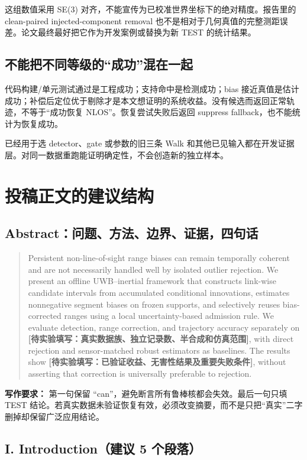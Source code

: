 \documentclass[UTF8,fontset=fandol,11pt,a4paper]{ctexart}
\newcommand{\todo}[1]{\textbf{[待实验填写：#1]}}
\newcommand{\eng}[1]{\begin{quote}\small #1\end{quote}}
\begin{document}
这组数值采用 SE(3) 对齐，不能宣传为已校准世界坐标下的绝对精度。报告里的 clean-paired injected-component removal 也不是相对于几何真值的完整测距误差。论文最终最好把它作为开发案例或替换为新 TEST 的统计结果。\cite{e2e}

\subsection{不能把不同等级的“成功”混在一起}

代码构建/单元测试通过是工程成功；支持命中是检测成功；bias 接近真值是估计成功；补偿后定位优于剔除才是本文想证明的系统收益。没有候选而返回正常轨迹，不等于“成功恢复 NLOS”。恢复尝试失败后返回 suppress fallback，也不能统计为恢复成功。

已经用于选 detector、gate 或参数的旧三条 Walk 和其他已见输入都在开发证据层。对同一数据重跑能证明确定性，不会创造新的独立样本。

\section{投稿正文的建议结构}

\subsection{Abstract：问题、方法、边界、证据，四句话}

\eng{Persistent non-line-of-sight range biases can remain temporally coherent and are not necessarily handled well by isolated outlier rejection. We present an offline UWB--inertial framework that constructs link-wise candidate intervals from accumulated conditional innovations, estimates nonnegative segment biases on frozen supports, and selectively reuses bias-corrected ranges using a local uncertainty-based admission rule. We evaluate detection, range correction, and trajectory accuracy separately on \todo{真实数据族、独立记录数、半合成和仿真范围}, with direct rejection and sensor-matched robust estimators as baselines. The results show \todo{已验证收益、无害性结果及重要失败条件}, without asserting that correction is universally preferable to rejection.}

\textbf{写作要求：} 第一句保留 ``can''，避免断言所有鲁棒核都会失效。最后一句只填 TEST 结论。若真实数据未验证恢复有效，必须改变摘要，而不是只把“真实”二字删掉却保留广泛应用结论。

\subsection{I. Introduction（建议 5 个段落）}
\end{document}
